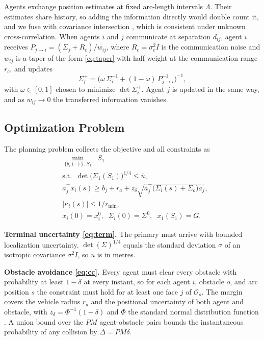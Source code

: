 \documentclass[letterpaper, 10 pt, conference]{ieeeconf}
\theoremstyle{remark}
\begin{document}
Agents exchange position estimates at fixed arc-length intervals $\Lambda$.
Their estimates share history, so adding the information directly would
double count it, and we fuse with covariance intersection
\cite{julier1997cov}, which is consistent under unknown cross-correlation.
When agents $i$ and $j$ communicate at separation $d_{ij}$, agent $i$
receives $P_{j \to i} = (\Sigma_j + R_c)/w_{ij}$, where $R_c = \sigma_c^2 I$
is the communication noise and $w_{ij}$ is a taper of the form
\eqref{eq:taper} with half weight at the communication range $r_c$, and
updates
\begin{equation}
  \Sigma_i^{+} = \Big( \omega\,\Sigma_i^{-1} + (1-\omega)\,P_{j \to i}^{-1} \Big)^{-1},
  \label{eq:ci}
\end{equation}
with $\omega \in [0,1]$ chosen to minimize $\det\Sigma_i^{+}$. Agent $j$ is
updated in the same way, and as $w_{ij} \to 0$ the transferred information
vanishes.

\subsection{Optimization Problem}

The planning problem collects the objective and all constraints as
\begin{subequations}
\label{eq:opt}
\begin{align}
  & \min_{\{\theta_i(\cdot)\},\, S_1}\;\; S_1 \nonumber \\
  & \mathrm{s.t.}\;\;
    \det\big(\Sigma_1(S_1)\big)^{1/4} \le \bar{u}, \label{eq:term} \\
  & a_j^{\top} x_i(s) \ge b_j + r_a
      + z_\delta \sqrt{a_j^{\top}\big(\Sigma_i(s) + \Sigma_o\big)a_j},
      \label{eq:cc} \\
  & |\kappa_i(s)| \le 1/r_{\min}, \label{eq:kin} \\
  & x_i(0) = x_i^0,\;\; \Sigma_i(0) = \Sigma^0,\;\; x_1(S_1) = G.
      \label{eq:bc}
\end{align}
\end{subequations}

\textbf{Terminal uncertainty \eqref{eq:term}.} The primary must arrive with
bounded localization uncertainty. $\det(\Sigma)^{1/4}$ equals the standard
deviation $\sigma$ of an isotropic covariance $\sigma^2 I$, so $\bar{u}$ is
in metres.

\textbf{Obstacle avoidance \eqref{eq:cc}.} Every agent must clear every
obstacle with probability at least $1-\delta$ at every instant, so for each
agent $i$, obstacle $o$, and arc position $s$ the constraint must hold for at
least one face $j$ of $\mathcal{O}_o$. The margin covers the vehicle radius
$r_a$ and the positional uncertainty of both agent and obstacle, with
$z_\delta = \Phi^{-1}(1-\delta)$ and $\Phi$ the standard normal distribution
function \cite{blackmore2011chance}. A union bound over the $PM$
agent-obstacle pairs bounds the instantaneous probability of any collision by
$\Delta = PM\delta$.
\end{document}
